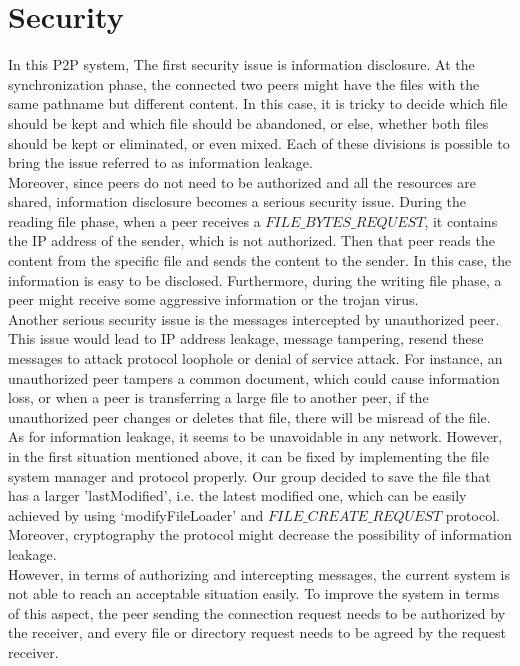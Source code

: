 \documentclass[a4paper,10pt,titlepage,twocolumn]{article}
\begin{document}
    \section*{Security}
    In this P2P system, The first security issue is information disclosure. At the synchronization phase, the connected two peers might have the files with the same pathname but different content. In this case, it is tricky to decide which file should be kept and which file should be abandoned, or else, whether both files should be kept or eliminated, or even mixed. Each of these divisions is possible to bring the issue referred to as information leakage. 
    \\Moreover, since peers do not need to be authorized and all the resources are shared, information disclosure becomes a serious security issue. During the reading file phase, when a peer receives a $FILE\_BYTES\_REQUEST$, it contains the IP address of the sender, which is not authorized. Then that peer reads the content from the specific file and sends the content to the sender. In this case, the information is easy to be disclosed. Furthermore, during the writing file phase, a peer might receive some aggressive information or the trojan virus. 
    \\Another serious security issue is the messages intercepted by unauthorized peer. This issue would lead to IP address leakage, message tampering, resend these messages to attack protocol loophole or denial of service attack. For instance, an unauthorized peer tampers a common document, which could cause information loss, or when a peer is transferring a large file to another peer, if the unauthorized peer changes or deletes that file, there will be misread of the file.
    \\As for information leakage, it seems to be unavoidable in any network. However, in the first situation mentioned above, it can be fixed by implementing the file system manager and protocol properly. Our group decided to save the file that has a larger ’lastModified’, i.e. the latest modified one, which can be easily achieved by using ‘modifyFileLoader’ and $FILE\_CREATE\_REQUEST$ protocol. Moreover, cryptography the protocol might decrease the possibility of information leakage.
    \\However, in terms of authorizing and intercepting messages, the current system is not able to reach an acceptable situation easily. To improve the system in terms of this aspect, the peer sending the connection request needs to be authorized by the receiver, and every file or directory request needs to be agreed by the request receiver.
\end{document}
